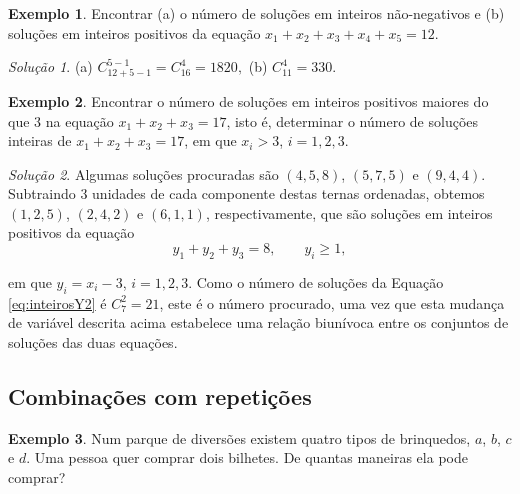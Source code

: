 \documentclass[]{book}
\theoremstyle{definition}
\theoremstyle{definition}
\newtheorem{example}{Exemplo}[chapter]
\theoremstyle{definition}
\theoremstyle{remark}
\newtheorem*{solution}{Solução}
\begin{document}
\begin{example}
\protect\hypertarget{exm:unnamed-chunk-86}{}{\label{exm:unnamed-chunk-86} }Encontrar (a) o número de soluções em inteiros não-negativos e (b) soluções em inteiros positivos da equação \(x_1 + x_2 + x_3 + x_4 + x_5 = 12\).
\end{example}

\begin{solution}
\iffalse{} {Solução. } \fi{}(a) \(C^{5-1}_{12+5-1} = C^{4}_{16} = 1820,\)
(b) \(C^{4}_{11} = 330.\)
\end{solution}

\begin{example}
\protect\hypertarget{exm:unnamed-chunk-88}{}{\label{exm:unnamed-chunk-88} }Encontrar o número de soluções em inteiros positivos maiores do que \(3\) na equação \(x_1 + x_2 + x_3 = 17\), isto é, determinar o número de soluções inteiras de \(x_1 + x_2 + x_3 = 17\), em que \(x_i>3\), \(i=1,2,3\).
\end{example}

\begin{solution}
\iffalse{} {Solução. } \fi{}Algumas soluções procuradas são \((4,5,8)\), \((5,7,5)\) e \((9,4,4)\).
Subtraindo \(3\) unidades de cada componente destas ternas ordenadas, obtemos \((1,2,5)\), \((2,4,2)\) e \((6,1,1)\), respectivamente, que são soluções em inteiros positivos da equação
\begin{equation}
y_1 + y_2 + y_3 = 8, \qquad y_i\geq 1,
\label{eq:inteirosY2}
\end{equation}

em que \(y_i=x_i-3\), \(i=1,2,3\).
Como o número de soluções da Equação \eqref{eq:inteirosY2} é \(C^2_7=21\), este é o número procurado, uma vez que esta mudança de variável descrita acima estabelece uma relação biunívoca entre os conjuntos de soluções das duas equações.
\end{solution}

\hypertarget{combinauxe7uxf5es-com-repetiuxe7uxf5es}{%
\subsection{Combinações com repetições}\label{combinauxe7uxf5es-com-repetiuxe7uxf5es}}

\begin{example}
\protect\hypertarget{exm:parqueDiversoes}{}{\label{exm:parqueDiversoes} }Num parque de diversões existem quatro tipos de brinquedos, \(a\), \(b\), \(c\) e \(d\).
Uma pessoa quer comprar dois bilhetes.
De quantas maneiras ela pode comprar?
\end{example}
\end{document}
